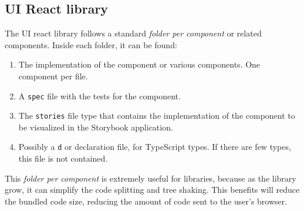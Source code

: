 \documentclass[./memory.tex]{subfiles}
\begin{document}
\subsection{UI React library}
The UI react library follows a standard \emph{folder per component} or related
components. Inside each folder, it can be found:
\begin{enumerate}[label = -]
	\item The implementation of the component or various components. One component
	      per file.
	\item A \texttt{spec} file with the tests for the component.
	\item The \texttt{stories} file type that contains the implementation of the
	      component to be visualized in the Storybook application.
	\item Possibly a \texttt{d} or declaration file, for TypeScript types. If
	      there are few types, this file is not contained.
\end{enumerate}
This \emph{folder per component} is extremely useful for libraries, because as
the library grow, it can simplify the code splitting and tree shaking. This
benefits will reduce the bundled code size, reducing the amount of code sent to
the user's browser.
\end{document}
